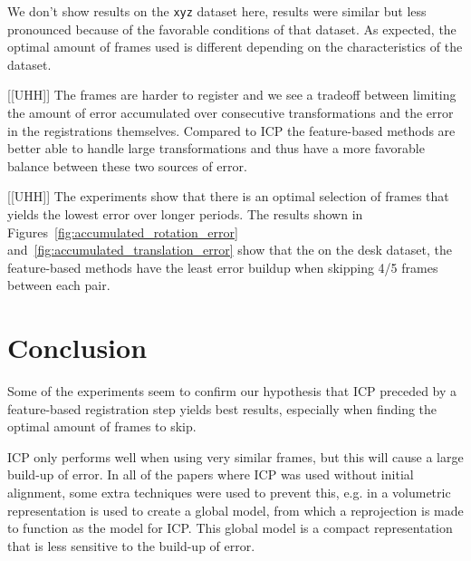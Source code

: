 \documentclass[a4paper]{article}
\begin{document}
We don't show results on the \texttt{xyz} dataset here, results were similar but less pronounced because of the favorable conditions of that dataset. As expected, the optimal amount of frames used is different depending on the characteristics of the dataset.

[[UHH]] The frames are harder to register and we see a tradeoff between limiting the amount of error accumulated over consecutive transformations and the error in the registrations themselves. Compared to \ac{ICP} the feature-based methods are better able to handle large transformations and thus have a more favorable balance between these two sources of error.

[[UHH]] The experiments show that there is an optimal selection of frames that yields the lowest error over longer periods. The results shown in Figures~\ref{fig:accumulated_rotation_error} and~\ref{fig:accumulated_translation_error} show that the on the desk dataset, the feature-based methods have the least error buildup when skipping 4/5 frames between each pair. 




\section{Conclusion}
Some of the experiments seem to confirm our hypothesis that \ac{ICP} preceded by a feature-based registration step yields best results, especially when finding the optimal amount of frames to skip.

\ac{ICP} only performs well when using very similar frames, but this will cause a large build-up of error. In all of the papers where \ac{ICP} was used without initial alignment, some extra techniques were used to prevent this, e.g. in \cite{izadi2011kinectfusion} a volumetric representation is used to create a global model, from which a reprojection is made to function as the model for \ac{ICP}. This global model is a compact representation that is less sensitive to the build-up of error.
\end{document}
